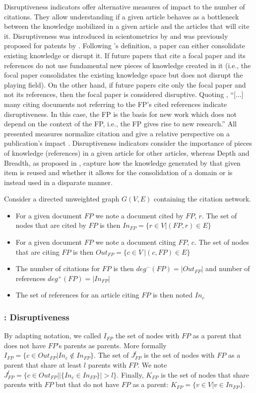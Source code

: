 Disruptiveness indicators offer alternative measures of impact to the number of citations. They allow understanding if a given article behaves as a bottleneck between the knowledge mobilized in a given article and the articles that will cite it. Disruptiveness was introduced in scientometrics by \cite{wu2019large} and was previously proposed for patents by \cite{funk2017dynamic}. Following \cite{azoulay2019small}'s definition, a paper can either consolidate existing knowledge or disrupt it. If future papers that cite a focal paper and its references do not use fundamental new pieces of knowledge created in it (i.e., the focal paper consolidates the existing knowledge space but does not disrupt the playing field). On the other hand, if future papers cite only the focal paper and not its references, then the focal paper is considered disruptive. Quoting \cite{bornmann1911disruption}, ``[...] many citing documents not referring to the FP’s cited references indicate disruptiveness. In this case, the FP is the basis for new work which does not depend on the context of the FP, i.e., the FP gives rise to new research.''
All presented measures normalize citation and give a relative perspective on a publication's impact \citep{bu2019multi}. Disruptiveness indicators consider the importance of pieces of knowledge (references) in a given article for other articles, whereas Depth and Breadth, as proposed in \cite{bu2019multi}, capture how the knowledge generated by that given item is reused and whether it allows for the consolidation of a domain or is instead used in a disparate manner.

Consider a directed unweighted graph $G(V, E)$ containing the citation network.
\begin{itemize}
    \item For a given document $FP$ we note a document cited by $FP$, $r$. The set of nodes that are cited by $FP$ is then $In_{FP} = \{r \in V | (FP,r) \in E \} $
    \item For a given document $FP$ we note a document citing $FP$, $c$. The set of nodes that are citing $FP$ is then $Out_{FP} = \{c \in V\ | (c,FP) \in E \} $
    \item The number of citations for $FP$ is then $deg^-(FP) = |Out_{FP}|$ and number of references $deg^+(FP) = |In_{FP}|$
    \item The set of references for an article citing $FP$ is then noted $In_c$
\end{itemize}

\subsubsection{\cite{wu2019large}: Disruptiveness}
\label{sec:wu}
By adapting \cite{wu2019large} notation, we called $I_{FP}$ the set of nodes with $FP$ as a parent that does not have $FP$'s parents as parents. More formally $I_{FP} = \{c \in Out_{FP} | In_c \notin In_{FP}\}$. The set of $J_{FP}^l$ is the set of nodes with $FP$ as a parent that share at least $l$ parents with $FP$. We note $J_{FP}^l = \{c \in Out_{FP} | |\{In_c \in In_{FP}\}| > l \}$. Finally, $K_{FP}$ is the set of nodes that share parents with $FP$ but that do not have $FP$ as a parent: $K_{FP} = \{v \in V | v \in In_{FP}\}$.



